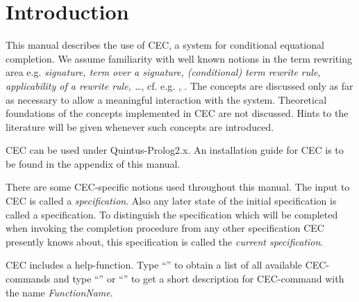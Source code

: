 \section{Introduction}

This manual describes the use of CEC,
a system for conditional equational completion. We assume familiarity
with well known notions in the term rewriting area e.g.
{\it
signature, term over a signature,
(conditional) term rewrite rule, applicability of a rewrite rule, 
\ldots}, cf. e.g. \cite{HO80}, \cite{Kap84}. The concepts are discussed only as far as
necessary to allow a meaningful interaction with the system. Theoretical
foundations of the concepts implemented in CEC are not discussed. 
Hints to the literature will be given whenever such concepts are introduced.

CEC can be used under Quintus-Prolog2.x.
An installation guide for CEC is to be found in the appendix of this manual.


There are some CEC-specific notions used throughout this manual. The input to 
CEC is called a 
{\it specification}. Also any later state of the initial
specification is called a specification. To distinguish the specification
which will be completed when invoking the completion procedure from any other
specification CEC presently knows about, this specification is called the 
{\it current specification}.

CEC includes a help-function. Type 
``'' to obtain a 
list of all available CEC-commands and type
``''
or ``'' to 
get a short description for
CEC-command with the name {\it FunctionName}.
